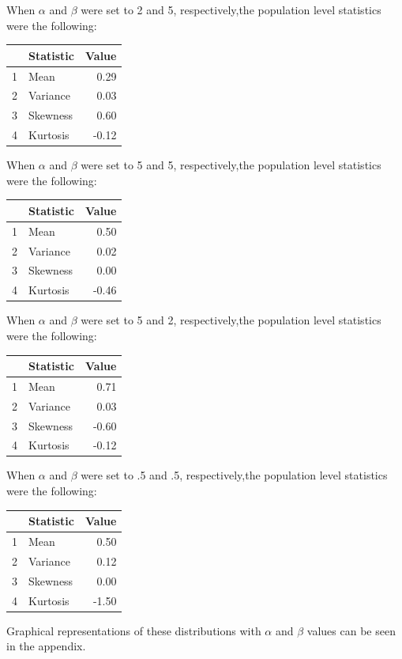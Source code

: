 \documentclass{article}\usepackage[]{graphicx}\usepackage[]{xcolor}
\begin{document}
\begin{multicols}{2}
When $\alpha$ and $\beta$ were set to 2 and 5, respectively,the population level statistics were the following:
\begin{table}[H]
\centering
\small
\begin{tabular}{|c|l|r|}
  \hline
 & Statistic & Value \\ 
  \hline
  1 & Mean & 0.29 \\ 
  2 & Variance & 0.03 \\ 
  3 & Skewness & 0.60 \\ 
  4 & Kurtosis & -0.12 \\ 
   \hline
\end{tabular}
\end{table}

When $\alpha$ and $\beta$ were set to 5 and 5, respectively,the population level statistics were the following:
\begin{table}[H]
\centering
\small
\begin{tabular}{|c|l|r|}
  \hline
 & Statistic & Value \\ 
  \hline
  1 & Mean & 0.50 \\ 
  2 & Variance & 0.02 \\ 
  3 & Skewness & 0.00 \\ 
  4 & Kurtosis & -0.46 \\ 
   \hline
\end{tabular}
\end{table}

When $\alpha$ and $\beta$ were set to 5 and 2, respectively,the population level statistics were the following:
\begin{table}[H]
\centering
\small
\begin{tabular}{|c|l|r|}
  \hline
 & Statistic & Value \\ 
  \hline
  1 & Mean & 0.71 \\ 
  2 & Variance & 0.03 \\ 
  3 & Skewness & -0.60 \\ 
  4 & Kurtosis & -0.12 \\ 
   \hline
\end{tabular}
\end{table}

When $\alpha$ and $\beta$ were set to .5 and .5, respectively,the population level statistics were the following:
\begin{table}[H]
\centering
\small
\begin{tabular}{|c|l|r|}
  \hline
 & Statistic & Value \\ 
  \hline
  1 & Mean & 0.50 \\ 
  2 & Variance & 0.12 \\ 
  3 & Skewness & 0.00 \\ 
  4 & Kurtosis & -1.50 \\ 
   \hline
\end{tabular}
\end{table}
Graphical representations of these distributions with $\alpha$ and $\beta$ values can be seen in the appendix.


\end{multicols}
\end{document}
